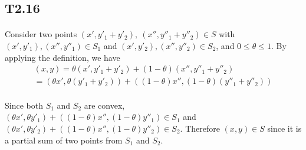 \subsection*{T2.16}
\paragraph{}
Consider two points $(x', y'_1+y'_2), \ (x'',y''_1 +y''_2) \in S$ with $(x', y'_1),  (x'',y''_1) \in S_1$ and $(x', y'_2), (x'',y''_2) \in S_2$, and $0\leq \theta \leq 1$. By applying the definition, we have
\begin{multline*}
(x,y)=\theta(x', y'_1+y'_2)+ (1-\theta) (x'',y''_1 +y''_2)\\
=(\theta x',\theta(y'_1+y'_2))+  ((1-\theta)x'',(1-\theta)(y''_1 +y''_2))
\end{multline*}
\paragraph{}
Since both $S_1$ and $S_2$ are convex, $(\theta x',\theta y'_1)+  ((1-\theta)x'',(1-\theta)y''_1) \in S_1$ and $(\theta x',\theta y'_2)+  ((1-\theta)x'',(1-\theta)y''_2) \in S_2$. Therefore $(x,y) \in S$ since it is a partial sum of two points from $S_1$ and $S_2$.
